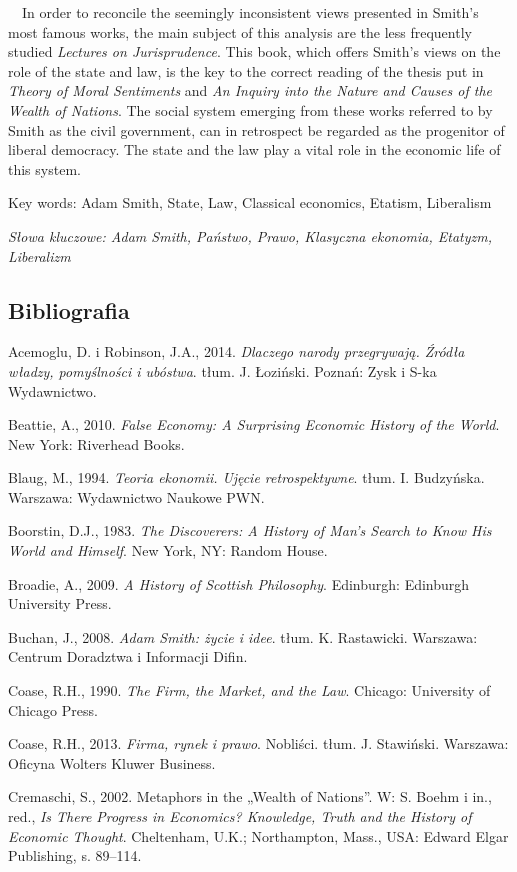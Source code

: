 \documentclass[a4paper]{article}
\begin{document}
 \ \ In order to reconcile the seemingly inconsistent views presented in Smith's most famous works, the main subject of
this analysis are the less frequently studied \textit{Lectures on Jurisprudence}. This book, which offers Smith's views
on the role of the state and law, is the key to the correct reading of the thesis put in \textit{Theory of Moral
Sentiments} and \textit{An Inquiry into the Nature and Causes of the Wealth of Nations}. The social system emerging
from these works referred to by Smith as the civil government, can in retrospect be regarded as the progenitor of
liberal democracy. The state and the law play a vital role in the economic life of this system.

Key words: Adam Smith, State, Law, Classical economics, Etatism, Liberalism 

{\itshape
Słowa kluczowe: Adam Smith, Państwo, Prawo, Klasyczna ekonomia, Etatyzm, Liberalizm}

\subsection{Bibliografia}
Acemoglu, D. i Robinson, J.A., 2014. \textit{Dlaczego narody przegrywają. Źródła władzy, pomyślności i ubóstwa}. tłum.
J. Łoziński. Poznań: Zysk i S-ka Wydawnictwo.

Beattie, A., 2010. \textit{False Economy: A Surprising Economic History of the World}. New York: Riverhead Books.

Blaug, M., 1994. \textit{Teoria ekonomii. Ujęcie retrospektywne}. tłum. I. Budzyńska. Warszawa: Wydawnictwo Naukowe PWN.

Boorstin, D.J., 1983. \textit{The Discoverers: A History of Man’s Search to Know His World and Himself}. New York, NY:
Random House.

Broadie, A., 2009. \textit{A History of Scottish Philosophy}. Edinburgh: Edinburgh University Press.

Buchan, J., 2008. \textit{Adam Smith: życie i idee}. tłum. K. Rastawicki. Warszawa: Centrum Doradztwa i Informacji
Difin.

Coase, R.H., 1990. \textit{The Firm, the Market, and the Law}. Chicago: University of Chicago Press.

Coase, R.H., 2013. \textit{Firma, rynek i prawo}. Nobliści. tłum. J. Stawiński. Warszawa: Oficyna Wolters Kluwer
Business.

Cremaschi, S., 2002. Metaphors in the „Wealth of Nations”. W: S. Boehm i in., red., \textit{Is There Progress in
Economics? Knowledge, Truth and the History of Economic Thought}. Cheltenham, U.K.; Northampton, Mass., USA: Edward
Elgar Publishing, s. 89–114.
\end{document}
